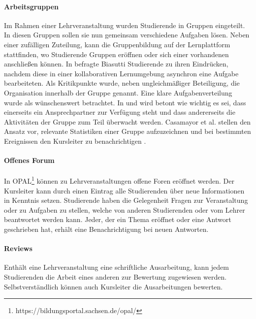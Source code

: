 \documentclass[conference]{IEEEtran}
\begin{document}
\paragraph{Arbeitsgruppen} Im Rahmen einer Lehrveranstaltung wurden Studierende in Gruppen eingeteilt. In diesen Gruppen sollen sie nun gemeinsam verschiedene Aufgaben lösen. Neben einer zufälligen Zuteilung, kann die Gruppenbildung auf der Lernplattform stattfinden, wo Studierende Gruppen eröffnen oder sich einer vorhandenen anschließen können. In \cite{dewiyanti2007students} befragte Biasutti Studierende zu ihren Eindrücken, nachdem diese in einer kollaborativen Lernumgebung asynchron eine Aufgabe bearbeiteten. Als Kritikpunkte wurde, neben ungleichmäßiger Beteiligung, die Organisation innerhalb der Gruppe genannt. Eine klare Aufgabenverteilung wurde als wünschenswert betrachtet. In \cite{paechter2010students} und \cite{casamayor2009intelligent} wird betont wie wichtig es sei, dass einerseits ein Ansprechpartner zur Verfügung steht und dass  andererseits die Aktivitäten der Gruppe zum Teil überwacht werden. Casamayor et al. stellen den Ansatz vor, relevante Statistiken einer Gruppe aufzuzeichnen und bei bestimmten Ereignissen den Kursleiter zu benachrichtigen \cite{casamayor2009intelligent}. 
\paragraph{Offenes Forum} In OPAL\footnote{https://bildungsportal.sachsen.de/opal/} können zu Lehrveranstaltungen offene Foren eröffnet werden. Der Kursleiter kann durch einen Eintrag alle Studierenden über neue Informationen in Kenntnis setzen. Studierende haben die Gelegenheit Fragen zur Veranstaltung oder zu Aufgaben zu stellen, welche von anderen Studierenden oder vom Lehrer beantwortet werden kann. Jeder, der ein Thema eröffnet oder eine Antwort geschrieben hat, erhält eine Benachrichtigung bei neuen Antworten. 
\paragraph{Reviews} Enthält eine Lehrveranstaltung eine schriftliche Ausarbeitung, kann jedem Studierenden die Arbeit eines anderen zur Bewertung zugewiesen werden. Selbstverständlich können auch Kursleiter die Ausarbeitungen bewerten. 
	


	
\end{document}
